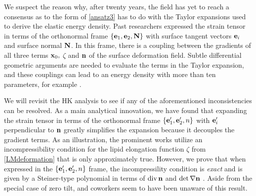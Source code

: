   We suspect the reason why, after twenty years, the field has yet to reach a consensus 
  as to the form of \eqref{ansatz3} has to do with the Taylor expansions used to derive the elastic energy density. 
  Past researchers expressed the strain tensor in
  terms of the orthonormal frame $\{{\bf e}_1, {\bf e}_2, {\bf N}\}$ with surface tangent vectors ${\bf e}_i$ and surface normal ${\bf N}$.  
  In this frame, there is a coupling between the gradients of all three terms ${\bf x}_0,$ $\zeta$ and ${\bf n}$ of the surface deformation field.
  Subtle differential geometric arguments are needed to evaluate the terms in the Taylor expansion,
  and these couplings can lead to an energy density with more than ten parameters, for example \cite{PhysRevE.102.042406}.
  
  We will revisit the HK analysis to see if any of the aforementioned inconsistencies can be resolved.
  As a main analytical innovation, we have found that expanding the strain tensor in
  terms of the orthonormal frame $\{{\bf e}'_1, {\bf e}'_2, n\}$ with ${\bf e}'_i$ perpendicular to ${\bf n}$
  greatly simplifies the expansion because it decouples the gradient terms. As an illustration, the prominent works
  \cite{TerziDeserno17, PhysRevE.102.042406, Hamm2000, C9SM02079A} utilize an
  incompressibility condition for the lipid elongation function $\zeta$ from \eqref{LMdeformation} that is only approximately true. 
  However, we prove that when expressed in the $\{{\bf e}'_1, {\bf e}'_2, n\}$ frame, the incompressility condition is \emph{exact}
  and is given by a Steiner-type polynomial in terms of $\operatorname{div} {\bf n}$ and $\det \nabla {\bf n}$ \cite{Fe59}.
  Aside from the special case of zero tilt, \cite{Hamm2000} and coworkers seem to have been unaware of this result.


